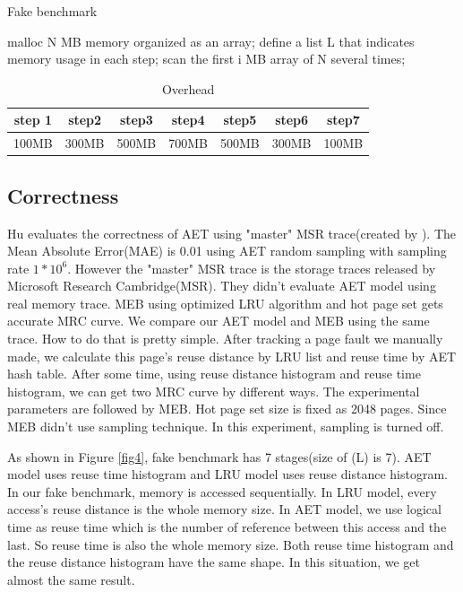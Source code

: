 \documentclass[10pt,twocolumn]{article}
\begin{document}
\begin{algorithm}
	\caption{Fake benchmark}
	\label{alg1}
		\begin{algorithmic}  
			\STATE malloc N MB memory organized as an array;
			\STATE define a list L that indicates memory usage in each step;
			\STATE scan the first i MB array of N several times;\  
			\ENDFOR  
		\end{algorithmic}  
\end{algorithm}

\vspace{3pt}
\renewcommand\arraystretch{1.5}
\begin{table}[htbp]
	\caption{Overhead}\label{table3}
	\centering
	\begin{tabular}{|c|c|c|c|c|c|c|}
		\hline
		step 1 & step2 & step3 & step4 & step5 & step6 & step7 \\
		\hline
		100MB & 300MB & 500MB & 700MB & 500MB & 300MB & 100MB \\
		\hline
	\end{tabular}
\end{table}
\subsection{Correctness}
Hu\cite{aet} evaluates the correctness of AET using "master" MSR trace(created by \cite{Wires2014Characterizing}). The Mean Absolute Error(MAE) is 0.01 using AET random sampling with sampling rate $1*10^6$. However the "master" MSR trace is the storage traces released by Microsoft Research Cambridge(MSR)\cite{Narayanan2008Write}. They didn't evaluate AET model using real memory trace. MEB\cite{Wang2016Dynamic} using optimized LRU algorithm and hot page set gets accurate MRC curve. We compare our AET model and MEB using the same trace. How to do that is pretty simple. After tracking a page fault we manually made, we calculate this page's reuse distance by LRU list and reuse time by AET hash table. After some time, using reuse distance histogram and reuse time histogram, we can get two MRC curve by different ways. The experimental parameters are followed by MEB\cite{Wang2016Dynamic}. Hot page set size is fixed as 2048 pages. Since MEB didn't use sampling technique. In this experiment, sampling is turned off.

As shown in Figure \ref{fig4}, fake benchmark has 7 stages(size of (L) is 7). AET model uses reuse time histogram and LRU model uses reuse distance histogram. In our fake benchmark, memory is accessed sequentially. In LRU model, every access's reuse distance is the whole memory size. In AET model, we use logical time as reuse time which is the number of reference between this access and the last. So reuse time is also the whole memory size. Both reuse time histogram and the reuse distance histogram have the same shape. In this situation, we get almost the same result.
\end{document}
